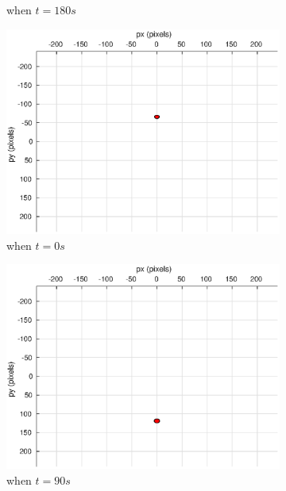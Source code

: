 \begin{figure}
\begin{subfigure}[b]{0.32\linewidth}
		\caption{when $t=180s$}
	\end{subfigure}
	\begin{subfigure}[b]{0.32\linewidth}
		\includegraphics[width=\textwidth]{images/chapter4/image_camera_-5mps}
		\caption{when $t=0s$}
	\end{subfigure}
	\begin{subfigure}[b]{0.32\linewidth}
		\includegraphics[width=\textwidth]{images/chapter4/image_camera_-5mps_90s}
		\caption{when $t=90s$}
	\end{subfigure}
	\begin{subfigure}[b]{0.32\linewidth}

\end{subfigure}
\end{figure}
